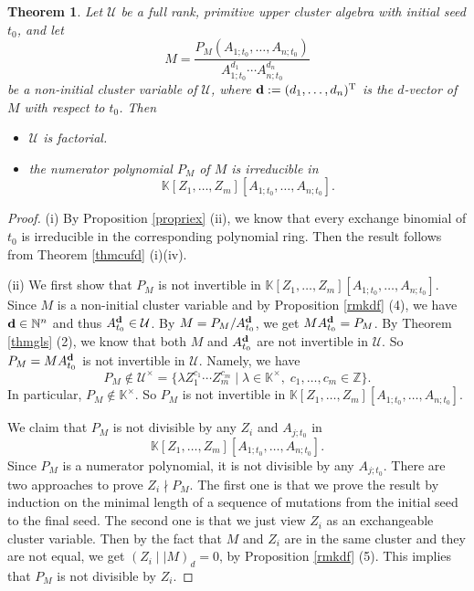 \documentclass{amsart}
\newtheorem{theorem}{Theorem}[section]
\theoremstyle{definition}
\theoremstyle{remark}
\numberwithin{equation}{section}
\begin{document}
\begin{theorem}\label{thmufd}
Let $\mathcal U$ be a full rank, primitive upper cluster algebra with initial seed $t_0$, and let $$M=\frac{P_M(A_{1;t_0},\ldots,A_{n;t_0})}{A_{1;t_0}^{d_1}\cdots A_{n;t_0}^{d_n}}$$ be a non-initial cluster variable of $\mathcal U$,  where ${\bf d}:=(d_1,\ldots,d_n)^{\rm T}$ is the $d$-vector of $M$ with respect to $t_0$. Then
\begin{itemize}
\item[(i)] $\mathcal U$ is factorial.
\item[(ii)] the numerator polynomial $P_M$ of $M$ is irreducible in $$\mathbb K[Z_1,\ldots,Z_m][A_{1;t_0},\ldots,A_{n;t_0}].$$
\end{itemize}


\end{theorem}
\begin{proof}
(i)  By Proposition \ref{propriex} (ii), we know that every exchange binomial of $t_0$ is irreducible in the corresponding polynomial ring. Then the result follows from Theorem \ref{thmcufd} (i)(iv).


(ii)  We first show that  $P_M$ is not invertible in $\mathbb K[Z_1,\ldots,Z_m][A_{1;t_0},\ldots,A_{n;t_0}]$.
Since $M$ is a non-initial cluster variable and by Proposition \ref{rmkdf} (4), we have ${\bf d}\in\mathbb N^n$ and thus $A_{t_0}^{\bf d}\in\mathcal U$. By $M=P_M/A_{t_0}^{\bf d}$, we get $MA_{t_0}^{\bf d}=P_M$. By Theorem \ref{thmgls} (2), we know that both $M$ and $A_{t_0}^{\bf d}$ are not invertible in $\mathcal U$. So $P_M=MA_{t_0}^{\bf d}$ is not invertible in $\mathcal U$. Namely, we have
$$P_M\notin\mathcal U^\times=\{\lambda Z_1^{c_1}\cdots Z_m^{c_m}\mid \lambda\in\mathbb K^\times,\; c_1,\ldots,c_m\in \mathbb Z\}.$$
In particular, $P_M\notin\mathbb K^\times$. So $P_M$ is not invertible in $\mathbb K[Z_1,\ldots,Z_m][A_{1;t_0},\ldots,A_{n;t_0}]$.

We claim that $P_M$ is not divisible by any $Z_i$ and $A_{j;t_0}$ in $$\mathbb K[Z_1,\ldots,Z_m][A_{1;t_0},\ldots,A_{n;t_0}].$$ Since $P_M$ is a numerator polynomial, it is not divisible by any $A_{j;t_0}$. There are two approaches to prove $Z_i\nmid P_M$. The first one is that we prove the result by induction on the minimal length of a sequence of  mutations from the initial seed to the final seed. The second one is that we just view $Z_i$ as an exchangeable cluster variable. Then by the fact that $M$ and $Z_i$ are in the same cluster and  they are not equal, we get $(Z_i\mid\mid M)_d=0$, by Proposition \ref{rmkdf} (5). This implies that $P_M$ is not divisible by $Z_i$.


\end{proof}
\end{document}
